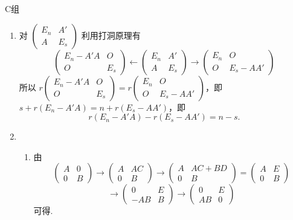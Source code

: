 \centerline{\heiti C组}
\begin{enumerate}
    \item 对 $\begin{pmatrix}E_n & A' \\ A & E_s\end{pmatrix}$ 利用打洞原理有
          \[\begin{pmatrix}E_n-A'A & O \\ O & E_s\end{pmatrix} \leftarrow \begin{pmatrix}E_n & A' \\ A & E_s\end{pmatrix} \rightarrow \begin{pmatrix}E_n & O \\ O & E_s-AA'\end{pmatrix}\]
          所以 $r\begin{pmatrix}E_n-A'A & O \\ O & E_s\end{pmatrix}=r\begin{pmatrix}E_n & O \\ O & E_s-AA'\end{pmatrix}$，即 $s+r(E_n-A'A)=n+r(E_s-AA')$，即
          \[r(E_n-A'A)-r(E_s-AA')=n-s.\]

    \item \begin{enumerate}
              \item 由 \[\begin{pmatrix}A & 0 \\ 0 & B\end{pmatrix}\rightarrow \begin{pmatrix}A & AC \\ 0 & B\end{pmatrix}\rightarrow \begin{pmatrix}A & AC+BD \\ 0 & B\end{pmatrix}=\begin{pmatrix}A & E \\ 0 & B\end{pmatrix}\]
                    \[\rightarrow \begin{pmatrix}0 & E \\ -AB & B\end{pmatrix}\rightarrow \begin{pmatrix}0 & E \\ AB & 0\end{pmatrix}\]
                    可得.


\end{enumerate}
\end{enumerate}
